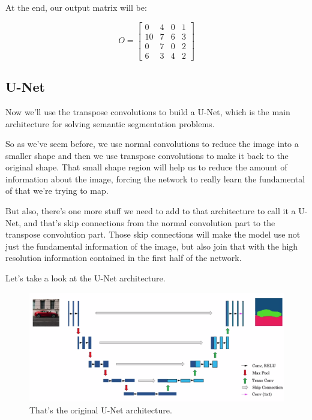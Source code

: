 \documentclass[12pt, a4paper, oneside]{book}
\begin{document}
At the end, our output matrix will be:

\[
O = \begin{bmatrix}
    0 & 4 & 0 & 1 \\
    10 & 7 & 6 & 3 \\
    0 & 7 & 0 & 2 \\
    6 & 3 & 4 & 2
\end{bmatrix}
\]

\subsection{U-Net}%
\label{sub:u_net}

Now we'll use the transpose convolutions to build a U-Net, which is the main
architecture for solving semantic segmentation problems.

So as we've seem before, we use normal convolutions to reduce the image into a
smaller shape and then we use transpose convolutions to make it back to the
original shape. That small shape region will help us to reduce the amount of
information about the image, forcing the network to really learn the fundamental
of that we're trying to map.

But also, there's one more stuff we need to add to that architecture to call it
a U-Net, and that's skip connections from the normal convolution part to the
transpose convolution part. Those skip connections will make the model use not
just the fundamental information of the image, but also join that with the
high resolution information contained in the first half of the network.

Let's take a look at the U-Net architecture.

\begin{figure}[h]
\centering
\includegraphics[scale=0.45]{Res/u-net_architecture.png}
\caption{That's the original U-Net architecture.}
\label{u-net_architecture.png}
\end{figure}
\end{document}
